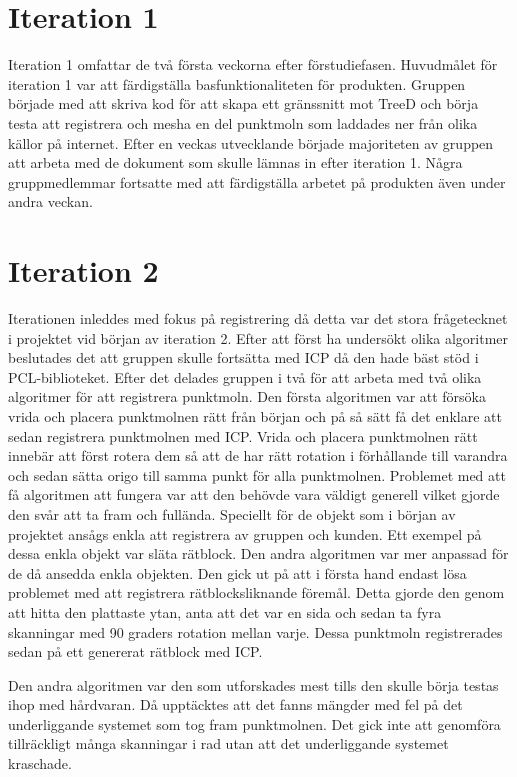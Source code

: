 \section{Iteration 1}

Iteration 1 omfattar de två första veckorna efter förstudiefasen. Huvudmålet för iteration 1 var att färdigställa basfunktionaliteten för produkten. Gruppen började med att skriva kod för att skapa ett gränssnitt mot TreeD och börja testa att registrera och mesha en del punktmoln som laddades ner från olika källor på internet. Efter en veckas utvecklande började majoriteten av gruppen att arbeta med de dokument som skulle lämnas in efter iteration 1. Några gruppmedlemmar fortsatte med att färdigställa arbetet på produkten även under andra veckan.

\section{Iteration 2}

Iterationen inleddes med fokus på registrering då detta var det stora frågetecknet i projektet vid början av iteration 2. Efter att först ha undersökt olika algoritmer beslutades det att gruppen skulle fortsätta med ICP då den hade bäst stöd i PCL-biblioteket. Efter det delades gruppen i två för att arbeta med två olika algoritmer för att registrera punktmoln. Den första algoritmen var att försöka vrida och placera punktmolnen rätt från början och på så sätt få det enklare att sedan registrera punktmolnen med ICP. Vrida och placera punktmolnen rätt innebär att först rotera dem så att de har rätt rotation i förhållande till varandra och sedan sätta origo till samma punkt för alla punktmolnen. Problemet med att få algoritmen att fungera var att den behövde vara väldigt generell vilket gjorde den svår att ta fram och fullända. Speciellt för de objekt som i början av projektet ansågs enkla att registrera av gruppen och kunden. Ett exempel på dessa enkla objekt var släta rätblock. Den andra algoritmen var mer anpassad för de då ansedda enkla objekten. Den gick ut på att i första hand endast lösa problemet med att registrera rätblocksliknande föremål. Detta gjorde den genom att hitta den plattaste ytan, anta att det var en sida och sedan ta fyra skanningar med 90 graders rotation mellan varje. Dessa punktmoln registrerades sedan på ett genererat rätblock med ICP.

Den andra algoritmen var den som utforskades mest tills den skulle börja testas ihop med hårdvaran. Då upptäcktes att det fanns mängder med fel på det underliggande systemet som tog fram punktmolnen. Det gick inte att genomföra tillräckligt många skanningar i rad utan att det underliggande systemet kraschade.

